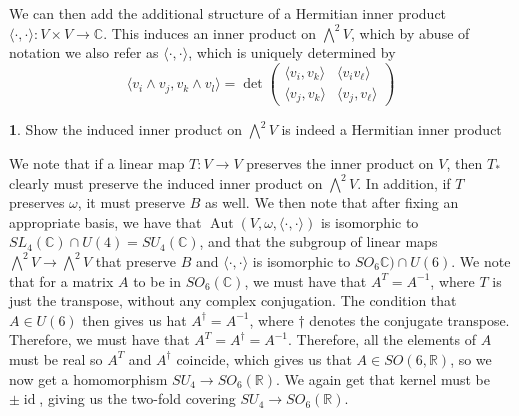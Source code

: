 \documentclass[psamsfonts]{amsart}
\theoremstyle{definition}
\newtheorem{TODO}{\ib{TODO}}
\theoremstyle{remark}
\newcommand{\R}{\mathbb{R}}
\newcommand{\ib}[1]{\textbf{\textit{#1}}}
\newcommand{\C}{\mathbb{C}}
\newcommand{\inv}{^{-1}}
\DeclareMathOperator{\id}{id}
\DeclareMathOperator{\Aut}{Aut}
\begin{document}
We can then add the additional structure of a Hermitian inner product $\langle \cdot,\cdot \rangle : V \times V \to \C$. This induces an inner product on $\bigwedge^2V$, which by abuse of notation we also refer as $\langle \cdot,\cdot \rangle$, which is uniquely determined by 
$$\langle v_i \wedge v_j, v_k \wedge v_l \rangle = \det \begin{pmatrix}
\langle v_i, v_k \rangle & \langle v_i v_\ell \rangle \\
\langle v_j, v_k \rangle & \langle v_j, v_\ell \rangle
\end{pmatrix} $$
%
\begin{TODO}
Show the induced inner product on $\bigwedge^2V$ is indeed a Hermitian inner product
\end{TODO}
We note that if a linear map $T : V \to V$ preserves the inner product on $V$, then $T_*$ clearly must preserve the induced inner product on $\bigwedge^2 V$. In addition, if $T$ preserves $\omega$, it must preserve $B$ as well. We then note that after fixing an appropriate basis, we have that $\Aut(V,\omega, \langle \cdot,\cdot \rangle)$ is isomorphic to $SL_4(\C) \cap U(4) = SU_4(\C)$, and that the subgroup of linear maps $\bigwedge^2 V \to \bigwedge^2V$ that preserve $B$ and $\langle \cdot,\cdot \rangle$ is isomorphic to $SO_6\C) \cap U(6)$. We note that for a matrix $A$ to be in $SO_6(\C)$, we must have that $A^T = A\inv$, where $T$ is just the transpose, without any complex conjugation. The condition that $A \in U(6)$ then gives us hat $A^\dagger = A\inv$, where $\dagger$ denotes the conjugate transpose. Therefore, we must have that $A^T = A^\dagger = A\inv$. Therefore, all the elements of $A$ must be real so $A^T$ and $A^\dagger$ coincide, which gives us that $A \in SO(6, \R)$, so we now get a homomorphism $SU_4 \to SO_6(\R)$. We again get that kernel must be $\pm \id$, giving us the two-fold covering $SU_4 \to SO_6(\R)$.
%
\setcounter{section}{10}
%
\setcounter{thm}{0}
%
\end{document}
